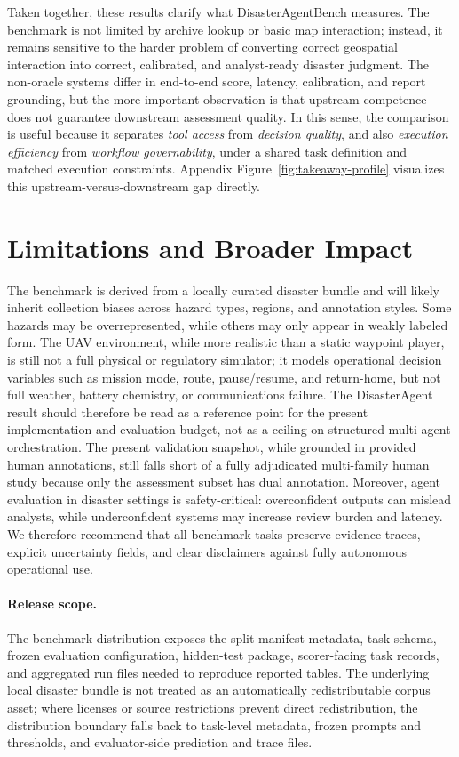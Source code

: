 \documentclass{article}
\begin{document}
Taken together, these results clarify what DisasterAgentBench measures. The benchmark is not limited by archive lookup or basic map interaction; instead, it remains sensitive to the harder problem of converting correct geospatial interaction into correct, calibrated, and analyst-ready disaster judgment. The non-oracle systems differ in end-to-end score, latency, calibration, and report grounding, but the more important observation is that upstream competence does not guarantee downstream assessment quality. In this sense, the comparison is useful because it separates \emph{tool access} from \emph{decision quality}, and also \emph{execution efficiency} from \emph{workflow governability}, under a shared task definition and matched execution constraints. Appendix Figure~\ref{fig:takeaway-profile} visualizes this upstream-versus-downstream gap directly.

\section{Limitations and Broader Impact}

The benchmark is derived from a locally curated disaster bundle and will likely inherit collection biases across hazard types, regions, and annotation styles. Some hazards may be overrepresented, while others may only appear in weakly labeled form. The UAV environment, while more realistic than a static waypoint player, is still not a full physical or regulatory simulator; it models operational decision variables such as mission mode, route, pause/resume, and return-home, but not full weather, battery chemistry, or communications failure. The DisasterAgent result should therefore be read as a reference point for the present implementation and evaluation budget, not as a ceiling on structured multi-agent orchestration. The present validation snapshot, while grounded in provided human annotations, still falls short of a fully adjudicated multi-family human study because only the assessment subset has dual annotation. Moreover, agent evaluation in disaster settings is safety-critical: overconfident outputs can mislead analysts, while underconfident systems may increase review burden and latency. We therefore recommend that all benchmark tasks preserve evidence traces, explicit uncertainty fields, and clear disclaimers against fully autonomous operational use.

\paragraph{Release scope.}
The benchmark distribution exposes the split-manifest metadata, task schema, frozen evaluation configuration, hidden-test package, scorer-facing task records, and aggregated run files needed to reproduce reported tables. The underlying local disaster bundle is not treated as an automatically redistributable corpus asset; where licenses or source restrictions prevent direct redistribution, the distribution boundary falls back to task-level metadata, frozen prompts and thresholds, and evaluator-side prediction and trace files.
\end{document}
